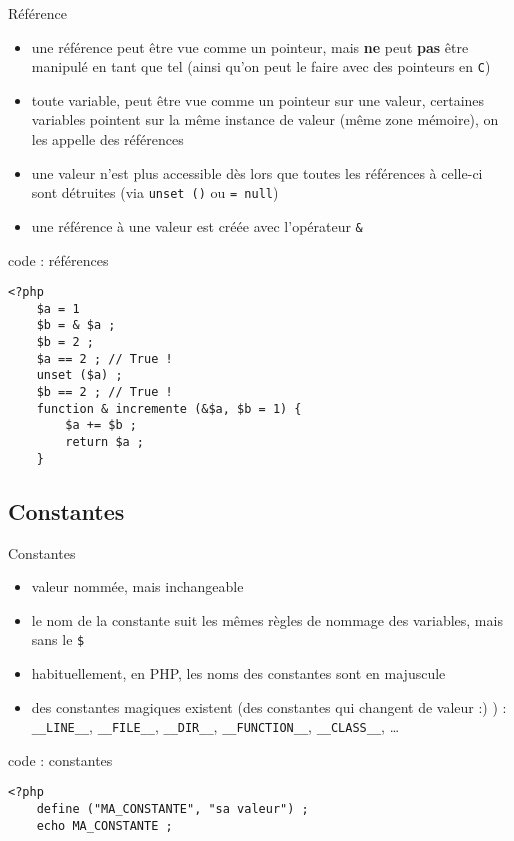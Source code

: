 \begin{frame}[containsverbatim]{Référence}
	\begin{itemize}
		\item une référence peut être vue comme un pointeur, mais \textbf{ne} peut \textbf{pas} être manipulé en tant que tel (ainsi qu'on peut le faire avec des pointeurs en \texttt{C})
		\item toute variable, peut être vue comme un pointeur sur une valeur, certaines variables pointent sur la même instance de valeur (même zone mémoire), on les appelle des références
		\item une valeur n'est plus accessible dès lors que toutes les références à celle-ci sont détruites (via \texttt{unset ()} ou \texttt{= null})
		\item une référence à une valeur est créée avec l'opérateur \texttt{\&}
	\end{itemize}
	\begin{block}{code : références}
		\begin{lstlisting}
<?php
	$a = 1
	$b = & $a ;
	$b = 2 ;
	$a == 2 ; // True !
	unset ($a) ;
	$b == 2 ; // True !
	function & incremente (&$a, $b = 1) {
		$a += $b ;
		return $a ;
	}
		\end{lstlisting}
	\end{block}
\end{frame}

\subsection{Constantes}

\begin{frame}[containsverbatim]{Constantes}
	\begin{itemize}
		\item valeur nommée, mais inchangeable
		\item le nom de la constante suit les mêmes règles de nommage des variables, mais sans le \texttt{\$}
		\item habituellement, en PHP, les noms des constantes sont en majuscule
		\item des constantes magiques existent (des constantes qui changent de valeur :) ) : \texttt{\_\_LINE\_\_}, \texttt{\_\_FILE\_\_}, \texttt{\_\_DIR\_\_}, \texttt{\_\_FUNCTION\_\_}, \texttt{\_\_CLASS\_\_}, \ldots
	\end{itemize}
	\begin{block}{code : constantes}
		\begin{lstlisting}
<?php
	define ("MA_CONSTANTE", "sa valeur") ;
	echo MA_CONSTANTE ;
		\end{lstlisting}
	\end{block}
\end{frame}

